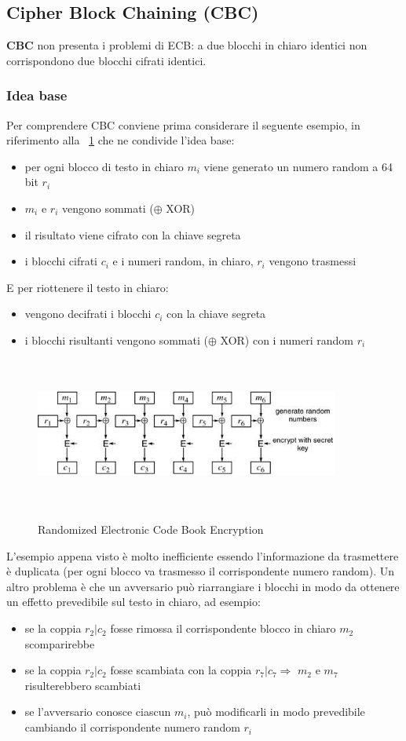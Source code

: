 \subsection{Cipher Block Chaining (CBC)}
\textbf{CBC} non presenta i problemi di ECB: a due blocchi in chiaro identici non corrispondono
due blocchi cifrati identici.
\subsubsection{Idea base}
Per comprendere CBC conviene prima considerare il seguente esempio, in riferimento alla \figurename ~\ref{fig:rand_ele_cb_enc} che ne condivide l'idea base:
\begin{itemize}
\item per ogni blocco di testo in chiaro $m_i$ viene generato un numero random a 64 bit $r_{i}$
\item $m_{i}$ e $r_{i}$ vengono sommati ($\oplus$ XOR)
\item il risultato viene cifrato con la chiave segreta
\item i blocchi cifrati $c_{i}$ e i numeri random, in chiaro, $r_{i}$ vengono trasmessi
\end{itemize}
E per riottenere il testo in chiaro:
\begin{itemize}
\item vengono decifrati i blocchi $c_{i}$ con la chiave segreta 
\item i blocchi risultanti vengono sommati ($\oplus$ XOR) con i numeri random $r_{i}$
\end{itemize}
\begin{figure}
\centering%
	\subfigure%
	{\includegraphics[height=5cm, width=10cm, keepaspectratio]{Immagini/modalita_operative/rand_ele_cb_enc.png}}
	\caption{Randomized Electronic Code Book Encryption\label{fig:rand_ele_cb_enc}} 	
\end{figure}
L'esempio appena visto è molto inefficiente essendo l'informazione da trasmettere è duplicata (per ogni blocco va trasmesso il corrispondente numero random). \newline
Un altro problema è che un avversario può riarrangiare i blocchi in modo da ottenere un effetto prevedibile sul testo in chiaro, ad esempio:
\begin{itemize}
\item se la coppia $r_{2}|c_{2}$ fosse rimossa il corrispondente blocco in chiaro $m_{2}$ scomparirebbe 
\item se la coppia $r_{2}|c_{2}$ fosse scambiata con la coppia $r_{7}|c_{7} \Rightarrow$ $m_{2}$ e $m_{7}$ risulterebbero scambiati
\item se l’avversario conosce ciascun  $m_{i}$, può modificarli in modo prevedibile cambiando il corrispondente numero random $r_{i}$
\end{itemize}
